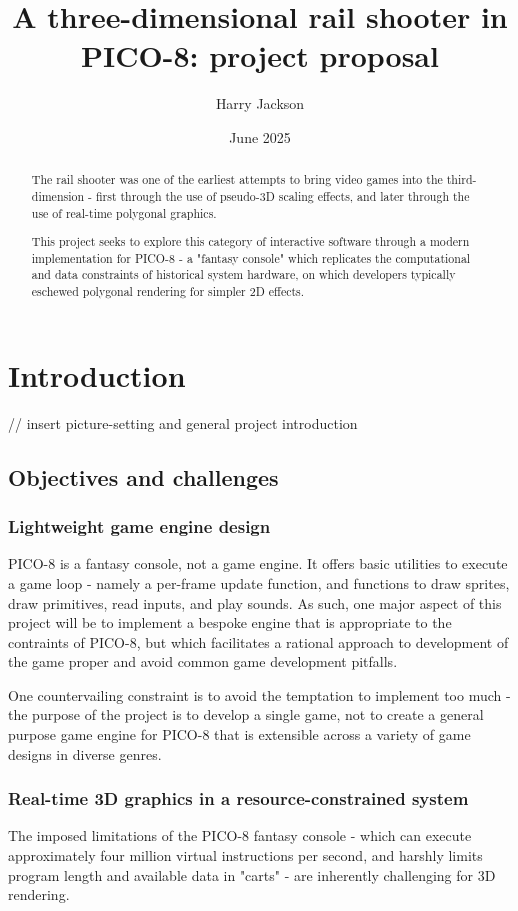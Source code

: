 \documentclass{article}
\title{A three-dimensional rail shooter in PICO-8: project proposal}
\author{Harry Jackson}
\date{June 2025}
\begin{document}
\maketitle

\begin{abstract}
The rail shooter was one of the earliest attempts to bring video
games into the third-dimension - first through the use of pseudo-3D
scaling effects, and later through the use of real-time polygonal graphics.

This project seeks to explore this category of interactive software through a
modern implementation for PICO-8 - a "fantasy console" which replicates the
computational and data constraints of historical system hardware, on which
developers typically eschewed polygonal rendering for simpler 2D effects.
\end{abstract}

\section{Introduction}

// insert picture-setting and general project introduction

\subsection*{Objectives and challenges}

\subsubsection*{Lightweight game engine design}
PICO-8 is a fantasy console, not a game engine. It offers basic utilities to execute a game loop -
namely a per-frame update function, and functions to draw sprites, draw primitives, read inputs, and
play sounds. As such, one major aspect of this project will be to implement a bespoke engine that is
appropriate to the contraints of PICO-8, but which facilitates a rational approach to development of
the game proper and avoid common game development pitfalls.

One countervailing constraint is to avoid the temptation to implement too much - the purpose of the
project is to develop a single game, not to create a general purpose game engine for PICO-8 that is
extensible across a variety of game designs in diverse genres.\cite{gregory}

\subsubsection*{Real-time 3D graphics in a resource-constrained system}
The imposed limitations of the PICO-8 fantasy console - which can execute approximately four million
virtual instructions per second, and harshly limits program length and available data in "carts" -
are inherently challenging for 3D rendering.
\end{document}
